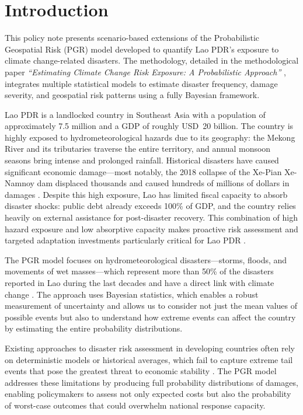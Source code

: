 \documentclass[11pt,a4paper]{article}
\begin{document}
\section{Introduction}

This policy note presents scenario-based extensions of the Probabilistic Geospatial Risk (PGR) model developed to quantify Lao PDR's exposure to climate change-related disasters. The methodology, detailed in the methodological paper \textit{``Estimating Climate Change Risk Exposure: A Probabilistic Approach''} \cite{saldarriaga2026}, integrates multiple statistical models to estimate disaster frequency, damage severity, and geospatial risk patterns using a fully Bayesian framework.

Lao PDR is a landlocked country in Southeast Asia with a population of approximately 7.5 million and a GDP of roughly USD~20 billion. The country is highly exposed to hydrometeorological hazards due to its geography: the Mekong River and its tributaries traverse the entire territory, and annual monsoon seasons bring intense and prolonged rainfall. Historical disasters have caused significant economic damage---most notably, the 2018 collapse of the Xe-Pian Xe-Namnoy dam displaced thousands and caused hundreds of millions of dollars in damages \cite{emdat2024, laopdr_pdna2018}. Despite this high exposure, Lao has limited fiscal capacity to absorb disaster shocks: public debt already exceeds 100\% of GDP, and the country relies heavily on external assistance for post-disaster recovery. This combination of high hazard exposure and low absorptive capacity makes proactive risk assessment and targeted adaptation investments particularly critical for Lao PDR \cite{ipcc2022ar6wg2}.

The PGR model focuses on hydrometeorological disasters---storms, floods, and movements of wet masses---which represent more than 50\% of the disasters reported in Lao during the last decades and have a direct link with climate change \cite{lopez2015, vanaalst2006}. The approach uses Bayesian statistics, which enables a robust measurement of uncertainty and allows us to consider not just the mean values of possible events but also to understand how extreme events can affect the country by estimating the entire probability distributions.

Existing approaches to disaster risk assessment in developing countries often rely on deterministic models or historical averages, which fail to capture extreme tail events that pose the greatest threat to economic stability \cite{cavallo2011, howard2017}. The PGR model addresses these limitations by producing full probability distributions of damages, enabling policymakers to assess not only expected costs but also the probability of worst-case outcomes that could overwhelm national response capacity.
\end{document}

